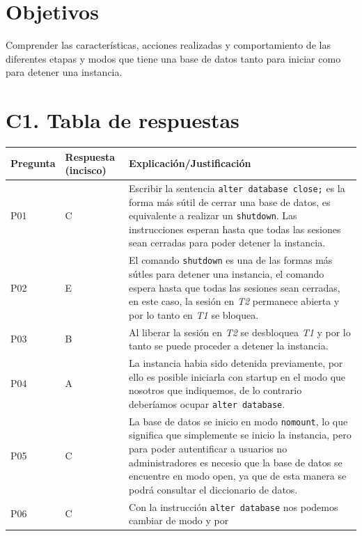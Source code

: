 \documentclass{article}
\begin{document}
\section*{Objetivos}
Comprender las características, acciones realizadas y comportamiento de las 
diferentes etapas y modos que tiene una base de datos tanto para
iniciar como para detener una instancia.

\section*{C1. Tabla de respuestas}

\begingroup
\renewcommand*{\arraystretch}{2}
\begin{longtable}[c]{
    |>{\centering}p{}
    |>{\centering}p{}
    |>{\arraybackslash}p{}|
}
\hline
Pregunta & Respuesta (incisco) & Explicación/Justificación \\ 
\hline
P01 & C & 
Escribir la sentencia \texttt{alter database close;} es la forma más sútil 
de cerrar una base de datos, es equivalente a realizar un \texttt{shutdown}.
Las instrucciones esperan hasta que todas las sesiones sean cerradas para poder
detener la instancia.
\\
\hline
P02 & E & 
El comando \texttt{shutdown} es una de las formas más sútles para detener una
instancia, el comando espera hasta que todas las sesiones sean cerradas, en este
caso, la sesión en \textit{T2} permanece abierta y por lo tanto en \textit{T1}
se bloquea.
\\
\hline
P03 & B & 
Al liberar la sesión en \textit{T2} se desbloquea \textit{T1} y por lo tanto
se puede proceder a detener la instancia.
\\
\hline
P04 & A & 
La instancia habia sido detenida previamente, por ello es posible iniciarla con
startup en el modo que nosotros que indiquemos, de lo contrario deberíamos 
ocupar \texttt{alter database}.
\\
\hline
P05 & C & 
La base de datos se inicio en modo \texttt{nomount}, lo que significa que 
simplemente se inicio la instancia, pero para poder autentificar a usuarios
no administradores es necesio que la base de datos se encuentre en modo open,
ya que de esta manera se podrá consultar el diccionario de datos.
\\
\hline
P06 & C & 
Con la instrucción \texttt{alter database} nos podemos cambiar de modo y por

\end{longtable}
\end{document}
